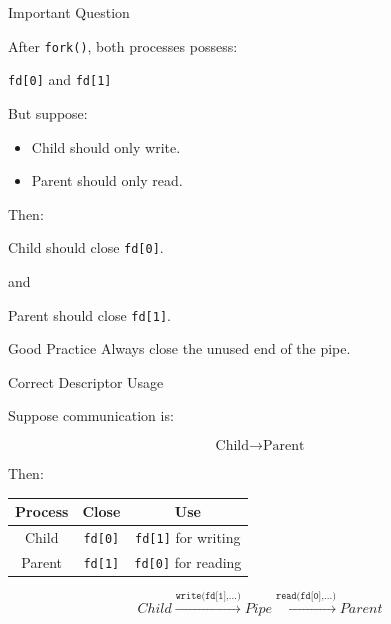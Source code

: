 \documentclass[aspectratio=169]{beamer}
\begin{document}
\begin{frame}{Important Question}

After \texttt{fork()}, both processes possess:

\begin{center}
\texttt{fd[0]} and \texttt{fd[1]}
\end{center}

But suppose:

\begin{itemize}
    \item Child should only write.
    \item Parent should only read.
\end{itemize}

Then:

\begin{center}
Child should close \texttt{fd[0]}.
\end{center}

and

\begin{center}
Parent should close \texttt{fd[1]}.
\end{center}

\begin{alertblock}{Good Practice}
Always close the unused end of the pipe.
\end{alertblock}

\end{frame}

\begin{frame}{Correct Descriptor Usage}

Suppose communication is:

\[
\text{Child} \longrightarrow \text{Parent}
\]

Then:

\begin{center}
\begin{tabular}{|c|c|c|}
\hline
\textbf{Process} & \textbf{Close} & \textbf{Use} \\
\hline

Child &
\texttt{fd[0]} &
\texttt{fd[1]} for writing
\\
\hline

Parent &
\texttt{fd[1]} &
\texttt{fd[0]} for reading
\\
\hline

\end{tabular}
\end{center}

\vspace{0.4cm}

\[
\boxed{
Child
\xrightarrow{\texttt{write(fd[1],...)}}
Pipe
\xrightarrow{\texttt{read(fd[0],...)}}
Parent
}
\]

\end{frame}
\end{document}
